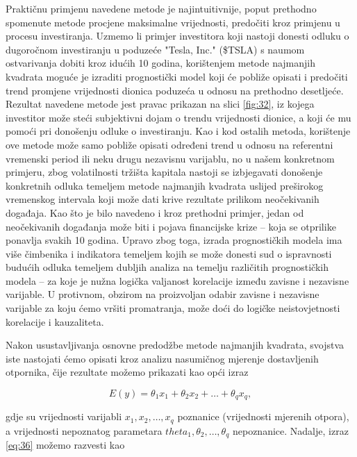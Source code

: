\documentclass[a4paper,12pt,oneside]{memoir}
\begin{document}
                Praktičnu primjenu navedene metode je najintuitivnije, poput prethodno spomenute metode procjene maksimalne vrijednosti, predočiti kroz primjenu u procesu investiranja. Uzmemo li primjer investitora koji nastoji donesti odluku o dugoročnom investiranju u poduzeće "Tesla, Inc." (\$TSLA) s naumom ostvarivanja dobiti kroz idućih 10 godina, korištenjem metode najmanjih kvadrata moguće je izraditi prognostički model koji će pobliže opisati i predočiti trend promjene vrijednosti dionica poduzeća u odnosu na prethodno desetljeće. Rezultat navedene metode jest pravac prikazan na slici \ref{fig:32}, iz kojega investitor može steći subjektivni dojam o trendu vrijednosti dionice, a koji će mu pomoći pri donošenju odluke o investiranju. Kao i kod ostalih metoda, korištenje ove metode može samo pobliže opisati određeni trend u odnosu na referentni vremenski period ili neku drugu nezavisnu varijablu, no u našem konkretnom primjeru, zbog volatilnosti tržišta kapitala nastoji se izbjegavati donošenje konkretnih odluka temeljem metode najmanjih kvadrata uslijed preširokog vremenskog intervala koji može dati krive rezultate prilikom neočekivanih događaja. Kao što je bilo navedeno i kroz prethodni primjer, jedan od neočekivanih događanja može biti i pojava financijske krize -- koja se otprilike ponavlja svakih 10 godina. Upravo zbog toga, izrada prognostičkih modela ima više čimbenika i indikatora temeljem kojih se može donesti sud o ispravnosti budućih odluka temeljem dubljih analiza na temelju različitih prognostičkih modela -- za koje je nužna logička valjanost korelacije između zavisne i nezavisne varijable. U protivnom, obzirom na proizvoljan odabir zavisne i nezavisne varijable za koju ćemo vršiti promatranja, može doći do logičke neistovjetnosti korelacije i kauzaliteta.

                Nakon usustavljivanja osnovne predodžbe metode najmanjih kvadrata, svojstva iste nastojati ćemo opisati kroz analizu nasumičnog mjerenje dostavljenih otpornika, čije rezultate možemo prikazati kao opći izraz

                \begin{equation}
                    E(y)=\theta_1x_1+\theta_2x_2+\ldots+\theta_qx_q,
                    \label{eq:36}
                \end{equation}

                gdje su vrijednosti varijabli $x_1,x_2,\ldots,x_q$ poznanice (vrijednosti mjerenih otpora), a vrijednosti nepoznatog parametara $theta_1,\theta_2,\ldots,\theta_q$ nepoznanice. Nadalje, izraz \eqref{eq:36} možemo razvesti kao
\end{document}
